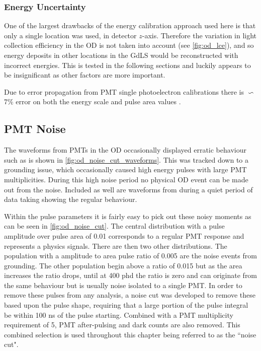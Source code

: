 \subsubsection{Energy Uncertainty}
\par
One of the largest drawbacks of the energy calibration approach used here is that only a single location was used, in detector $z$-axis.
Therefore the variation in light collection efficiency in the OD is not taken into account (see \autoref{fig:od_lce}), and so energy deposits in other locations in the GdLS would be reconstructed with incorrect energies.
This is tested in the following sections and luckily appears to be insignificant as other factors are more important.
\par
Due to error propagation from PMT single photoelectron calibrations there is $\backsim$7\% error on both the energy scale and pulse area values \cite{ewanfraser_thesis_ref}.


\subsection{PMT Noise}
\par
The waveforms from PMTs in the OD occasionally displayed erratic behaviour such as is shown in \autoref{fig:od_noise_cut_waveforms}.
This was tracked down to a grounding issue, which occasionally caused high energy pulses with large PMT multiplicities.
During this high noise period no physical OD event can be made out from the noise.
Included as well are waveforms from during a quiet period of data taking showing the regular behaviour.
\par
Within the pulse parameters it is fairly easy to pick out these noisy moments as can be seen in \autoref{fig:od_noise_cut}.
The central distribution with a pulse amplitude over pulse area of 0.01 corresponds to a regular PMT response and represents a physics signals.
There are then two other distributions.
The population with a amplitude to area pulse ratio of 0.005 are the noise events from grounding.
The other population begin above a ratio of 0.015 but as the area increases the ratio drops, until at 400 phd the ratio is zero and can originate from the same behaviour but is usually noise isolated to a single PMT.
In order to remove these pulses from any analysis, a noise cut was developed to remove these based upon the pulse shape, requiring that a large portion of the pulse integral be within 100 ns of the pulse starting.
Combined with a PMT multiplicity requirement of 5, PMT after-pulsing and dark counts are also removed.
This combined selection is used throughout this chapter being referred to as the ``noise cut".


